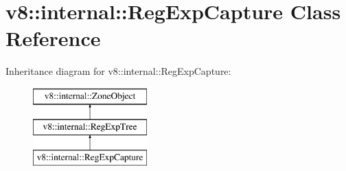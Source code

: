 \hypertarget{classv8_1_1internal_1_1_reg_exp_capture}{}\section{v8\+:\+:internal\+:\+:Reg\+Exp\+Capture Class Reference}
\label{classv8_1_1internal_1_1_reg_exp_capture}
Inheritance diagram for v8\+:\+:internal\+:\+:Reg\+Exp\+Capture\+:\begin{figure}[H]
\begin{center}
\leavevmode
\includegraphics[height=3.000000cm]{classv8_1_1internal_1_1_reg_exp_capture}
\end{center}
\end{figure}
